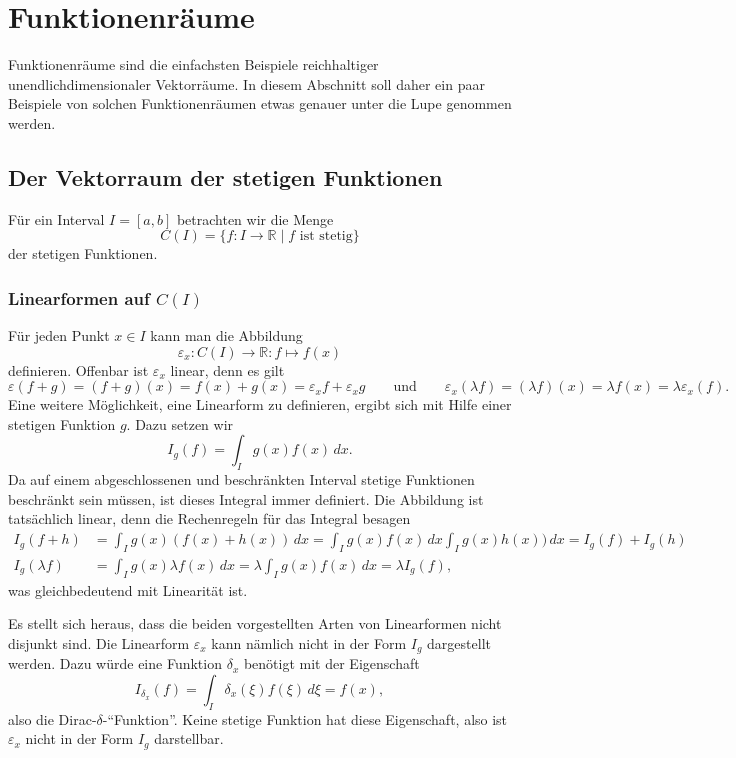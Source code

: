 %
%
%
\section{Funktionenräume}
Funktionenräume sind die einfachsten Beispiele reichhaltiger
unendlichdimensionaler Vektorräume.
In diesem Abschnitt soll daher ein paar Beispiele von solchen
Funktionenräumen etwas genauer unter die Lupe genommen werden.

\subsection{Der Vektorraum der stetigen Funktionen}
Für ein Interval $I=[a,b]$ betrachten wir die Menge
\[
C(I) = \{f\colon I\to\mathbb R\;|\; \text{$f$ ist stetig}\}
\]
der stetigen Funktionen.

\subsubsection{Linearformen auf $C(I)$}
Für jeden Punkt $x\in I$ kann man die Abbildung
\[
\varepsilon_x\colon C(I)\to\mathbb R: f\mapsto f(x)
\]
definieren.
Offenbar ist $\varepsilon_x$ linear, denn es gilt
\[
\varepsilon(f+g) = (f+g)(x) = f(x) + g(x) = \varepsilon_x f + \varepsilon_x g
\qquad\text{und}\qquad
\varepsilon_x (\lambda f) = (\lambda f)(x)= \lambda f(x)
=\lambda\varepsilon_x(f).
\]
Eine weitere Möglichkeit, eine Linearform zu definieren, ergibt sich mit
Hilfe einer stetigen Funktion $g$.
Dazu setzen wir
\[
I_g(f) =  \int_I g(x)f(x)\,dx.
\]
Da auf einem abgeschlossenen und beschränkten Interval stetige Funktionen
beschränkt sein müssen, ist dieses Integral immer definiert.
Die Abbildung ist tatsächlich linear, denn die Rechenregeln für das
Integral besagen
\begin{align*}
I_g(f+h)
&=
\int_Ig(x)(f(x)+h(x))\,dx
=
\int_Ig(x)f(x)\,dx \int_I g(x)h(x))\,dx
=
I_g(f) + I_g(h)
\\
I_g(\lambda f)
&=
\int_Ig(x)\lambda f(x)\,dx
=
\lambda\int_Ig(x)f(x)\,dx
=
\lambda I_g(f),
\end{align*}
was gleichbedeutend mit Linearität ist.

Es stellt sich heraus, dass die beiden vorgestellten Arten von Linearformen
nicht disjunkt sind.
Die Linearform $\varepsilon_x$ kann nämlich nicht in der Form $I_g$ dargestellt
werden.
Dazu würde eine Funktion $\delta_x$ benötigt mit der Eigenschaft
\[
I_{\delta_x}(f)= \int_I\delta_x(\xi)f(\xi)\,d\xi = f(x),
\]
also die Dirac-$\delta$-``Funktion''.
Keine stetige Funktion hat diese Eigenschaft, also ist $\varepsilon_x$
nicht in der Form $I_g$ darstellbar.

